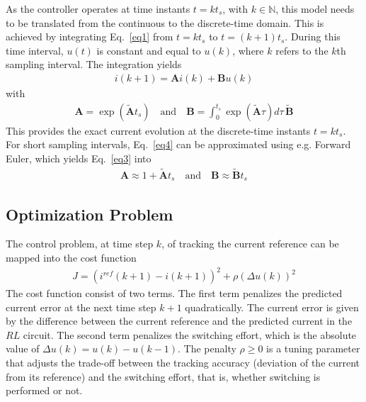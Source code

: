 \documentclass[12pt,a4paper,oneside]{book}
\begin{document}
\begin{onehalfspace}
As the controller operates at time instants $t=kt_s$, with $k\in\mathbb{N}$, 
this model needs to be translated from the continuous to the discrete-time 
domain. This is achieved by integrating Eq.~\eqref{eq1} from $t=kt_s$ to 
$t=(k+1)t_s$. During this time interval, $u(t)$ is constant and equal to 
$u(k)$, where $k$ refers to the $k$th sampling interval. The integration yields
\begin{equation}\label{eq3}
	\begin{aligned}
		i(k+1)={\mathbf{A}}i(k) + {\mathbf{B}}u(k)
	\end{aligned}
\end{equation}
with 
\begin{equation}\label{eq4}
	\begin{aligned}
		{\mathbf{A}}=\exp(\tilde{\mathbf{A}}t_s)\quad \text{and} \quad  
		{\mathbf{B}}=\int_{0}^{t_s}\exp(\tilde{\mathbf{A}}\tau)d\tau\,\tilde{\mathbf{B}}
	\end{aligned}
\end{equation}
This provides the exact current evolution at the discrete-time instants 
$t=kt_s$. For short sampling intervals, Eq.~\eqref{eq4} can be approximated 
using e.g. Forward Euler, which yields Eq.~\eqref{eq3} into
\begin{equation}\label{eq5}
	\begin{aligned}
		{\mathbf{A}} \approx 1 + \tilde{\mathbf{A}}t_s\quad \text{and} \quad  
		{\mathbf{B}} \approx \tilde{\mathbf{B}}t_s
	\end{aligned}
\end{equation}
\subsection{Optimization Problem} 
The control problem, at time step $k$, of tracking the current reference can be 
mapped into the cost function
\begin{equation}\label{eq6}
	\begin{aligned}
		J = (i^{ref}(k+1)-i(k+1))^2+\rho\left( \Delta u(k)\right) ^2
	\end{aligned}
\end{equation}
The cost function consist of two terms. The first term penalizes the predicted 
current error at the next time step $k+1$ quadratically. The current error is 
given by the difference between the current reference and the predicted current 
in the $RL$ circuit. The second term penalizes the switching effort, which is 
the absolute value of $\Delta u(k) = u(k)-u(k-1)$. The penalty $\rho \ge 0$ is 
a tuning parameter that adjusts the trade-off between the tracking accuracy 
(deviation of the current from its reference) and the switching effort, that 
is, whether switching is performed or not.


\end{onehalfspace}
\end{document}
